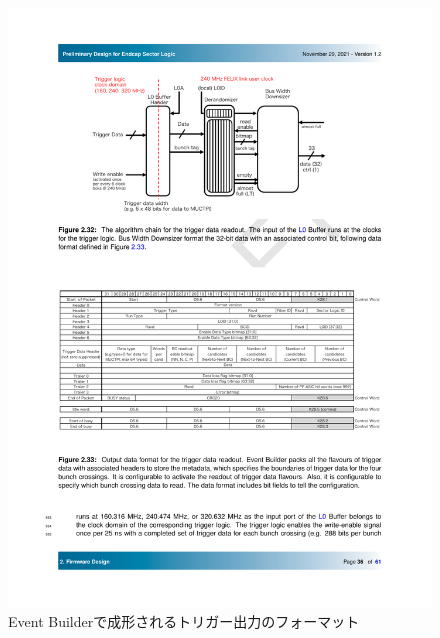 \begin{itemize}
    \begin{figure} 
    \centering
    \includegraphics[width=16cm]{fig/Test/TriggerReadout_format.pdf}
    \caption[Event Builderで成形されるトリガー出力のフォーマット]{Event Builderで成形されるトリガー出力のフォーマット\cite{SLPDR}}
    \label{TriggerReadout_format}
    \end{figure}
\end{itemize}

